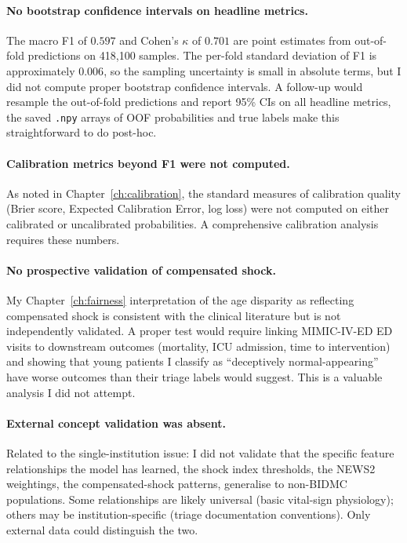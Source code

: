 \paragraph{No bootstrap confidence intervals on headline metrics.} The macro F1 of $0.597$ and Cohen's $\kappa$ of $0.701$ are point estimates from out-of-fold predictions on 418,100 samples. The per-fold standard deviation of F1 is approximately $0.006$, so the sampling uncertainty is small in absolute terms, but I did not compute proper bootstrap confidence intervals. A follow-up would resample the out-of-fold predictions and report 95\% CIs on all headline metrics, the saved \texttt{.npy} arrays of OOF probabilities and true labels make this straightforward to do post-hoc.

\paragraph{Calibration metrics beyond F1 were not computed.} As noted in Chapter~\ref{ch:calibration}, the standard measures of calibration quality (Brier score, Expected Calibration Error, log loss) were not computed on either calibrated or uncalibrated probabilities. A comprehensive calibration analysis requires these numbers.

\paragraph{No prospective validation of compensated shock.} My Chapter~\ref{ch:fairness} interpretation of the age disparity as reflecting compensated shock is consistent with the clinical literature but is not independently validated. A proper test would require linking MIMIC-IV-ED ED visits to downstream outcomes (mortality, ICU admission, time to intervention) and showing that young patients I classify as ``deceptively normal-appearing'' have worse outcomes than their triage labels would suggest. This is a valuable analysis I did not attempt.

\paragraph{External concept validation was absent.} Related to the single-institution issue: I did not validate that the specific feature relationships the model has learned, the shock index thresholds, the NEWS2 weightings, the compensated-shock patterns, generalise to non-BIDMC populations. Some relationships are likely universal (basic vital-sign physiology); others may be institution-specific (triage documentation conventions). Only external data could distinguish the two.

